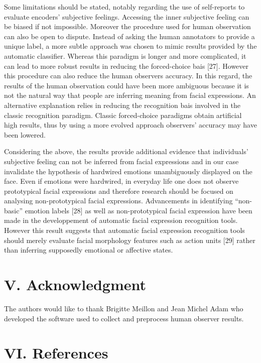 \documentclass[conference,final,]{IEEEtran}
\begin{document}
Some limitations should be stated, notably regarding the use of
self-reports to evaluate encoders' subjective feelings. Accessing the
inner subjective feeling can be biased if not impossible. Moreover the
procedure used for human observation can also be open to dispute.
Instead of asking the human annotators to provide a unique label, a more
subtle approach was chosen to mimic results provided by the automatic
classifier. Whereas this paradigm is longer and more complicated, it can
lead to more robust results in reducing the forced-choice bais {[}27{]}.
However this procedure can also reduce the human observers accuracy. In
this regard, the results of the human observation could have been more
ambiguous because it is not the natural way that people are inferring
meaning from facial expressions. An alternative explanation relies in
reducing the recognition bais involved in the classic recognition
paradigm. Classic forced-choice paradigms obtain artificial high
results, thus by using a more evolved approach observers' accuracy may
have been lowered.

Considering the above, the results provide additional evidence that
individuals' subjective feeling can not be inferred from facial
expressions and in our case invalidate the hypothesis of hardwired
emotions unambiguously displayed on the face. Even if emotions were
hardwired, in everyday life one does not observe prototypical facial
expressions and therefore research should be focused on analysing
non-prototypical facial expressions. Advancements in identifying
``non-basic'' emotion labels {[}28{]} as well as non-prototypical facial
expression have been made in the developpement of automatic facial
expression recognition tools. However this result suggests that
automatic facial expression recognition tools should merely evaluate
facial morphology features such as action units {[}29{]} rather than
inferring supposedly emotional or affective states.

\hypertarget{acknowledgment}{%
\section{V. Acknowledgment}\label{acknowledgment}}

The authors would like to thank Brigitte Meillon and Jean Michel Adam
who developed the software used to collect and preprocess human observer
results.

\hypertarget{references}{%
\section*{VI. References}\label{references}}
\end{document}
